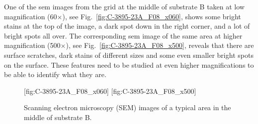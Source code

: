 



One of the \ac{sem} images from the grid at the middle of substrate B taken at low magnification (60$\times$), see Fig.~\ref{fig:C-3895-23A_F08_x060}, shows some bright stains at the top of the image, a dark spot down in the right corner, and a lot of bright spots all over. The corresponding \ac{sem} image of the same area at higher magnification (500$\times$), see Fig.~\ref{fig:C-3895-23A_F08_x500}, reveals that there are surface scratches, dark stains of different sizes and some even smaller bright spots on the surface. These features need to be studied at even higher magnifications to be able to identify what they are.

\begin{figure}[htbp]
    \centering
    [fig:C-3895-23A_F08_x060]
    [fig:C-3895-23A_F08_x500]
    \caption[SEM images of a typical area in the middle of substrate B.]{Scanning electron microscopy (SEM) images of a typical area in the middle of substrate B.}
    \label{fig:SEM_C389523_overview}
\end{figure}

